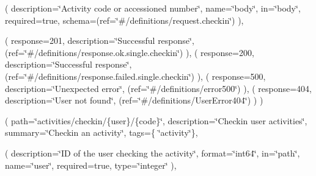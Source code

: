 ( description=\char`\"{}\+Activity code or accessioned number\char`\"{}, name=\char`\"{}body\char`\"{}, in=\char`\"{}body\char`\"{}, required=true, schema=(ref=\char`\"{}\#/definitions/request.\+checkin\char`\"{}) ),

( response=201, description=\char`\"{}\+Successful response\char`\"{}, (ref=\char`\"{}\#/definitions/response.\+ok.\+single.\+checkin\char`\"{}) ), ( response=200, description=\char`\"{}\+Successful response\char`\"{}, (ref=\char`\"{}\#/definitions/response.\+failed.\+single.\+checkin\char`\"{}) ), ( response=500, description=\char`\"{}\+Unexpected error\char`\"{}, (ref=\char`\"{}\#/definitions/error500\char`\"{}) ), ( response=404, description=\char`\"{}\+User not found\char`\"{}, (ref=\char`\"{}\#/definitions/\+User\+Error404\char`\"{}) ) )

( path=\char`\"{}activities/checkin/\{user\}/\{code\}\char`\"{}, description=\char`\"{}\+Checkin user activities\char`\"{}, summary=\char`\"{}\+Checkin an activity\char`\"{}, tags=\{ \char`\"{}activity\char`\"{}\},

( description=\char`\"{}\+I\+D of the user checking the activity\char`\"{}, format=\char`\"{}int64\char`\"{}, in=\char`\"{}path\char`\"{}, name=\char`\"{}user\char`\"{}, required=true, type=\char`\"{}integer\char`\"{} ),


